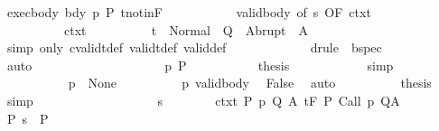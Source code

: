 \begin{isabellebody}
\ exec{\isacharunderscore}body\ bdy\ p\ P\ t{\isacharunderscore}notin{\isacharunderscore}F\ \isanewline
\ \ \ \ \ \ \ \ \ \ valid{\isacharunderscore}body{\isacharprime}\ {\isacharbrackleft}of\ {\isachardoublequoteopen}s{\isachardoublequoteclose}{\isacharcomma}\ OF\ ctxt{\isacharbrackright}\ \isanewline
\ \ \ \ \ \ \ \ \ \ ctxt\isanewline
\ \ \ \ \ \ \ \ \isamarkupfalse%
\ {\isachardoublequoteopen}t\ {\isasymin}\ Normal\ {\isacharbackquote}\ Q\ {\isasymunion}\ Abrupt\ {\isacharbackquote}\ A{\isachardoublequoteclose}\isanewline
\ \ \ \ \ \ \ \ \ \ \isamarkupfalse%
\ {\isacharparenleft}simp\ only{\isacharcolon}\ cvalidt{\isacharunderscore}def\ validt{\isacharunderscore}def\ valid{\isacharunderscore}def{\isacharparenright}\ \isanewline
\ \ \ \ \ \ \ \ \ \ \isamarkupfalse%
\ {\isacharparenleft}drule\ {\isacharparenleft}{}{\isacharparenright}\ bspec{\isacharparenright}\isanewline
\ \ \ \ \ \ \ \ \ \ \isamarkupfalse%
\ auto\isanewline
\ \ \ \ \ \ \ \ \ \ \isamarkupfalse%
\isanewline
\ \ \ \ \ \ \ \ \isamarkupfalse%
\ p\ P\ \isanewline
\ \ \ \ \ \ \ \ \isamarkupfalse%
\ {\isacharquery}thesis\isanewline
\ \ \ \ \ \ \ \ \ \ \isamarkupfalse%
\ simp\isanewline
\ \ \ \ \ \ \isamarkupfalse%
\isanewline
\ \ \ \ \ \ \ \ \isamarkupfalse%
\ {\isachardoublequoteopen}{\isasymGamma}\ p\ {\isacharequal}\ None{\isachardoublequoteclose}\isanewline
\ \ \ \ \ \ \ \ \isamarkupfalse%
\ p\ valid{\isacharunderscore}body\ \isamarkupfalse%
\ False\ \isamarkupfalse%
\ auto\isanewline
\ \ \ \ \ \ \ \ \isamarkupfalse%
\ {\isacharquery}thesis\ \isamarkupfalse%
\ simp\isanewline
\ \ \ \ \ \ \isamarkupfalse%
\isanewline
\ \ \ \ \isamarkupfalse%
\isanewline
\ \ \ \ \ \ \isamarkupfalse%
\ s\isanewline
\ \ \ \ \ \ \isamarkupfalse%
\ ctxt{\isacharcolon}\ {\isachardoublequoteopen}{\isasymforall}{\isacharparenleft}P{\isacharcomma}\ p{\isacharcomma}\ Q{\isacharcomma}\ A{\isacharparenright}{\isasymin}{\isasymTheta}{\isachardot}\ {\isasymGamma}{\isasymTurnstile}\isactrlsub t\isactrlbsub {\isacharslash}F\isactrlesub \ P\ {\isacharparenleft}Call\ p{\isacharparenright}\ Q{\isacharcomma}A{\isachardoublequoteclose}\ \isanewline
\ \ \ \ \ \ \isamarkupfalse%
\ P{\isacharcolon}\ {\isachardoublequoteopen}s\ {\isasymin}\ P{\isachardoublequoteclose}\isanewline
\ \ \ \ \ \ \isamarkupfalse%

\end{isabellebody}
